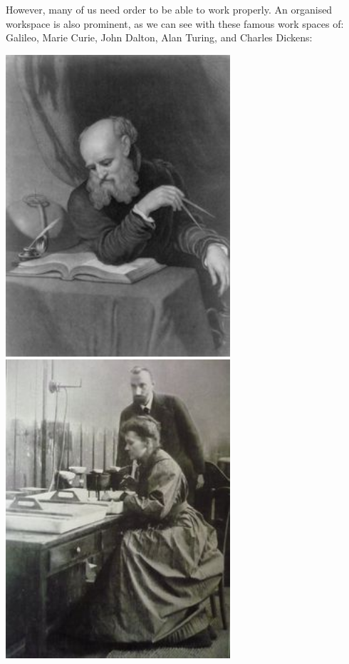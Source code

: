 \documentclass[
]{book}
\begin{document}
However, many of us need order to be able to work properly. An organised workspace is also prominent, as we can see with these famous work spaces of: Galileo, Marie Curie, John Dalton, Alan Turing, and Charles Dickens:

\includegraphics[width=3.28in]{imgs/galileo_desk}
\includegraphics[width=3.28in]{imgs/marie_curie}
\end{document}
